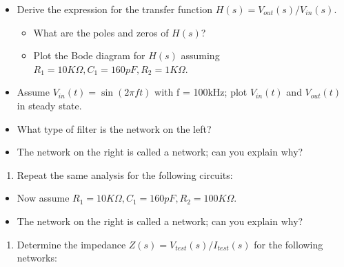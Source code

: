 \documentclass[letterpaper,10pt,english]{jupyterBook}
\begin{document}
\sphinxAtStartPar
{}
\begin{itemize}
\item {} 
\sphinxAtStartPar
Derive the expression for the transfer function \(H(s) = V_{out}(s)/V_{in}(s)\).
\begin{itemize}
\item {} 
\sphinxAtStartPar
What are the poles and zeros of \(H(s)\)?

\item {} 
\sphinxAtStartPar
Plot the Bode diagram for \(H(s)\) assuming \(R_1 = 10K\Omega, C_1 = 160pF, R_2 = 1K\Omega\).

\end{itemize}

\item {} 
\sphinxAtStartPar
Assume \(V_{in}(t) = \sin(2\pi f t)\) with f = 100kHz; plot \(V_{in}(t)\) and \(V_{out}(t)\) in steady state.

\item {} 
\sphinxAtStartPar
What type of filter is the network on the left?

\item {} 
\sphinxAtStartPar
The network on the right is called a  network; can you explain why?

\end{itemize}
\begin{enumerate}
%
\setcounter{enumi}{1}
\item {} 
\sphinxAtStartPar
Repeat the same analysis for the following circuits:

\end{enumerate}

\sphinxAtStartPar
{}
\begin{itemize}
\item {} 
\sphinxAtStartPar
Now assume \(R_1 = 10K\Omega, C_1 = 160pF, R_2 = 100K\Omega\).

\item {} 
\sphinxAtStartPar
The network on the right is called a  network; can you explain why?

\end{itemize}
\begin{enumerate}
%
\setcounter{enumi}{2}
\item {} 
\sphinxAtStartPar
Determine the impedance \(Z(s) = V_{test}(s)/I_{test}(s)\) for the following networks:

\end{enumerate}
\end{document}
